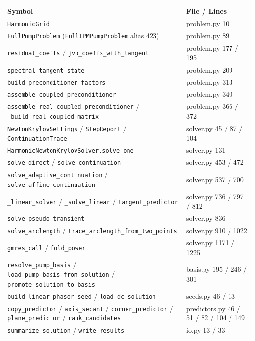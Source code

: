\documentclass[
  10pt,
]{article}
\newcounter{none} %
\begin{document}
{\def\LTcaptype{none} %
\begin{longtable}[]{@{}
  >{\raggedright\arraybackslash}p{}
  >{\raggedright\arraybackslash}p{}@{}}
\toprule\noalign{}
\begin{minipage}[b]{\linewidth}\raggedright
Symbol
\end{minipage} & \begin{minipage}[b]{\linewidth}\raggedright
File / Lines
\end{minipage} \\
\midrule\noalign{}
\endhead
\bottomrule\noalign{}
\endlastfoot
\texttt{HarmonicGrid} & problem.py 10 \\
\texttt{FullPumpProblem} (\texttt{FullIPMPumpProblem} alias 423) &
problem.py 89 \\
\texttt{residual\_coeffs} / \texttt{jvp\_coeffs\_with\_tangent} &
problem.py 177 / 195 \\
\texttt{spectral\_tangent\_state} & problem.py 209 \\
\texttt{build\_preconditioner\_factors} & problem.py 313 \\
\texttt{assemble\_coupled\_preconditioner} & problem.py 340 \\
\texttt{assemble\_real\_coupled\_preconditioner} /
\texttt{\_build\_real\_coupled\_matrix} & problem.py 366 / 372 \\
\texttt{NewtonKrylovSettings} / \texttt{StepReport} /
\texttt{ContinuationTrace} & solver.py 45 / 87 / 104 \\
\texttt{HarmonicNewtonKrylovSolver.solve\_one} & solver.py 131 \\
\texttt{solve\_direct} / \texttt{solve\_continuation} & solver.py 453 /
472 \\
\texttt{solve\_adaptive\_continuation} /
\texttt{solve\_affine\_continuation} & solver.py 537 / 700 \\
\texttt{\_linear\_solver} / \texttt{\_solve\_linear} /
\texttt{tangent\_predictor} & solver.py 736 / 797 / 812 \\
\texttt{solve\_pseudo\_transient} & solver.py 836 \\
\texttt{solve\_arclength} / \texttt{trace\_arclength\_from\_two\_points}
& solver.py 910 / 1022 \\
\texttt{gmres\_call} / \texttt{fold\_power} & solver.py 1171 / 1225 \\
\texttt{resolve\_pump\_basis} /
\texttt{load\_pump\_basis\_from\_solution} /
\texttt{promote\_solution\_to\_basis} & basis.py 195 / 246 / 301 \\
\texttt{build\_linear\_phasor\_seed} / \texttt{load\_dc\_solution} &
seeds.py 46 / 13 \\
\texttt{copy\_predictor} / \texttt{axis\_secant} /
\texttt{corner\_predictor} / \texttt{plane\_predictor} /
\texttt{rank\_candidates} & predictors.py 46 / 51 / 82 / 104 / 149 \\
\texttt{summarize\_solution} / \texttt{write\_results} & io.py 13 /
33 \\
\end{longtable}
}
\end{document}

